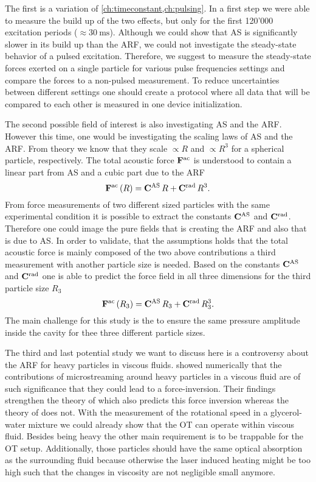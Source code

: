 The first is a variation of \cref{ch:timeconstant,ch:pulsing}. In a first step 
we were able to measure the build up of the two effects, but only for the first 
120'000 excitation periods ($\approx \SI{30}{\ms}$). Although we could show 
that AS is significantly slower in its build up than the ARF, we could not 
investigate the steady-state behavior of a pulsed excitation.  Therefore, we 
suggest to measure the steady-state forces exerted on a single particle for 
various pulse frequencies settings and compare the forces to a non-pulsed 
measurement. To reduce uncertainties between different settings one should 
create a protocol where all data that will be compared to each other is 
measured in one device initialization.

The second possible field of interest is also investigating AS and the ARF.  
However this time, one would be investigating the scaling laws of AS and the 
ARF. From theory we know that they scale $\propto R$ and $\propto R^{3}$ for a 
spherical particle, respectively. The total acoustic force 
$\vb{F}^{\mathrm{ac}}$ is understood to contain a linear part from AS and a 
cubic part due to the ARF
\begin{equation}
  \vb{F}^{\mathrm{ac}}\left( R \right) = \vb{C}^{\mathrm{AS}}\,R + 
  \vb{C}^{\mathrm{rad}}\,R^{3}.
\end{equation}
From force measurements of two different sized particles with the same 
experimental condition it is possible to extract the constants 
$\vb{C}^{\mathrm{AS}}$ and $\vb{C}^{\mathrm{rad}}$. Therefore one could image the pure 
fields that is creating the ARF and also that is due to AS. In order to 
validate, that the assumptions holds that the total acoustic force is mainly 
composed of the two above contributions a third measurement with another 
particle size is needed. Based on the constants $\vb{C}^{\mathrm{AS}}$ and 
$\vb{C}^{\mathrm{rad}}$ one is able to predict the force field in all three 
dimensions for the third particle size $R_{3}$
\begin{equation}
  \vb{F}^{\mathrm{ac}}\left( R_{3} \right) = \vb{C}^{\mathrm{AS}}\,R_{3} + 
  \vb{C}^{\mathrm{rad}}\,R^{3}_{3}.
\end{equation}
The main challenge for this study is the to ensure the same pressure amplitude 
inside the cavity for thee three different particle sizes.

The third and last potential study we want to discuss here is a controversy 
about the ARF for heavy particles in viscous fluids.  showed 
numerically that the contributions of microstreaming around heavy particles in 
a viscous fluid are of such significance that they could lead to a 
force-inversion. Their findings strengthen the theory of 
 which also predicts this force inversion whereas the 
theory of  does not. With the measurement of the rotational 
speed in a glycerol-water mixture we could already show that the OT can operate 
within viscous fluid. Besides being heavy the other main requirement is to be 
trappable for the OT setup. Additionally, those particles should have the same 
optical absorption as the surrounding fluid because otherwise the laser induced 
heating might be too high such that the changes in viscosity are not negligible 
small anymore.

